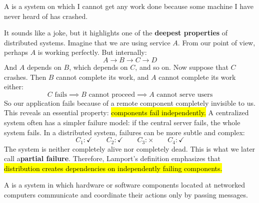 \highspace
\begin{definitionbox}
    A  is a system on which I cannot get any work done because some machine I have never heard of has crashed.
\end{definitionbox}

\highspace
It sounds like a joke, but it highlights one of the \textbf{deepest properties} of distributed systems. Imagine that we are using service $A$. From our point of view, perhaps $A$ is working perfectly. But internally:
\begin{equation*}
    A \to B \to C \to D
\end{equation*}
And $A$ depends on $B$, which depends on $C$, and so on. Now suppose that $C$ crashes. Then $B$ cannot complete its work, and $A$ cannot complete its work either:
\begin{equation*}
    C \text{ fails} \implies B \text{ cannot proceed} \implies A \text{ cannot serve users}
\end{equation*}
So our application fails because of a remote component completely invisible to us. This reveals an essential property: \hl{components fail independently.} A centralized system often has a simpler failure model: if the central server fails, the whole system fails. In a distributed system, failures can be more subtle and complex:
\begin{equation*}
    C_1:\checkmark
    \qquad
    C_2:\checkmark
    \qquad
    C_3:\times
    \qquad
    C_4:\checkmark
\end{equation*}
The system is neither completely alive nor completely dead. This is what we later call a\textbf{partial failure}. Therefore, Lamport's definition emphasizes that \hl{distribution creates dependencies on independently failing components.}

\highspace
\begin{definitionbox}
    A  is a system in which hardware or software components located at networked computers communicate and coordinate their actions only by passing messages.
\end{definitionbox}

